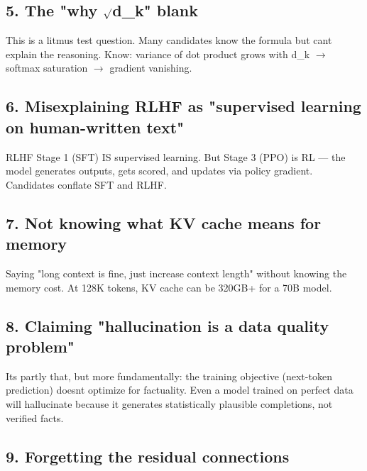 \documentclass[11pt]{article}
\begin{document}
\subsection{\texorpdfstring{5. The "why \(\surd\)d\_k" blank}{5. The "why \textbackslash surdd\_k" blank}}\label{5-the-why-surdd_k-blank}

This is a litmus test question. Many candidates know the formula but can\textquotesingle t explain the reasoning. Know: variance of dot product grows with d\_k \(\rightarrow\) softmax saturation \(\rightarrow\) gradient vanishing.

\subsection{6. Misexplaining RLHF as "supervised learning on human-written text"}\label{6-misexplaining-rlhf-as-supervised-learning-on-human-written-text}

RLHF Stage 1 (SFT) IS supervised learning. But Stage 3 (PPO) is RL --- the model generates outputs, gets scored, and updates via policy gradient. Candidates conflate SFT and RLHF.

\subsection{7. Not knowing what KV cache means for memory}\label{7-not-knowing-what-kv-cache-means-for-memory}

Saying "long context is fine, just increase context length" without knowing the memory cost. At 128K tokens, KV cache can be 320GB+ for a 70B model.

\subsection{8. Claiming "hallucination is a data quality problem"}\label{8-claiming-hallucination-is-a-data-quality-problem}

It\textquotesingle s partly that, but more fundamentally: the training objective (next-token prediction) doesn\textquotesingle t optimize for factuality. Even a model trained on perfect data will hallucinate because it generates statistically plausible completions, not verified facts.

\subsection{9. Forgetting the residual connections}\label{9-forgetting-the-residual-connections}
\end{document}
